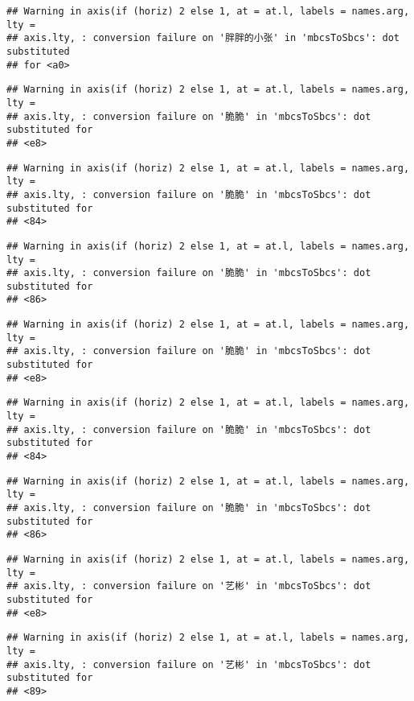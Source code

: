\documentclass[
]{article}
\begin{document}
\begin{verbatim}
## Warning in axis(if (horiz) 2 else 1, at = at.l, labels = names.arg, lty =
## axis.lty, : conversion failure on '胖胖的小张' in 'mbcsToSbcs': dot substituted
## for <a0>
\end{verbatim}

\begin{verbatim}
## Warning in axis(if (horiz) 2 else 1, at = at.l, labels = names.arg, lty =
## axis.lty, : conversion failure on '脆脆' in 'mbcsToSbcs': dot substituted for
## <e8>
\end{verbatim}

\begin{verbatim}
## Warning in axis(if (horiz) 2 else 1, at = at.l, labels = names.arg, lty =
## axis.lty, : conversion failure on '脆脆' in 'mbcsToSbcs': dot substituted for
## <84>
\end{verbatim}

\begin{verbatim}
## Warning in axis(if (horiz) 2 else 1, at = at.l, labels = names.arg, lty =
## axis.lty, : conversion failure on '脆脆' in 'mbcsToSbcs': dot substituted for
## <86>
\end{verbatim}

\begin{verbatim}
## Warning in axis(if (horiz) 2 else 1, at = at.l, labels = names.arg, lty =
## axis.lty, : conversion failure on '脆脆' in 'mbcsToSbcs': dot substituted for
## <e8>
\end{verbatim}

\begin{verbatim}
## Warning in axis(if (horiz) 2 else 1, at = at.l, labels = names.arg, lty =
## axis.lty, : conversion failure on '脆脆' in 'mbcsToSbcs': dot substituted for
## <84>
\end{verbatim}

\begin{verbatim}
## Warning in axis(if (horiz) 2 else 1, at = at.l, labels = names.arg, lty =
## axis.lty, : conversion failure on '脆脆' in 'mbcsToSbcs': dot substituted for
## <86>
\end{verbatim}

\begin{verbatim}
## Warning in axis(if (horiz) 2 else 1, at = at.l, labels = names.arg, lty =
## axis.lty, : conversion failure on '艺彬' in 'mbcsToSbcs': dot substituted for
## <e8>
\end{verbatim}

\begin{verbatim}
## Warning in axis(if (horiz) 2 else 1, at = at.l, labels = names.arg, lty =
## axis.lty, : conversion failure on '艺彬' in 'mbcsToSbcs': dot substituted for
## <89>
\end{verbatim}
\end{document}
